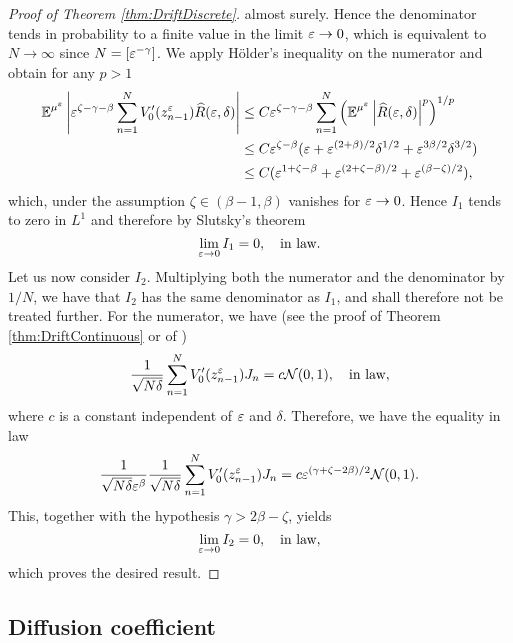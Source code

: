 \documentclass[10pt]{article}
\begin{document}
\begin{proof}[Proof of Theorem \ref{thm:DriftDiscrete}]
	almost surely. Hence the denominator tends in probability to a finite value in the limit $\varepsilon \to 0$, which is equivalent to $N \to \infty$ since $N = [\varepsilon^{-\gamma}]$. We apply Hölder's inequality on the numerator and obtain for any $p > 1$
	\begin{equation}
	\begin{aligned}
		\operatorname{\mathbb{E}}^{\mu^\varepsilon} \left\lvert\varepsilon^{\zeta-\gamma-\beta} \sum_{n=1}^{N}V_0'(z^\varepsilon_{n-1})\widehat R(\varepsilon, \delta)\right\rvert &\leq C \varepsilon^{\zeta-\gamma-\beta}\sum_{n=1}^{N} \left(\operatorname{\mathbb{E}}^{\mu^\varepsilon} \left\lvert\widehat R(\varepsilon, \delta)\right\rvert^p\right)^{1/p}\\
		&\leq C \varepsilon^{\zeta-\beta}(\varepsilon +  \varepsilon^{(2+\beta)/2}\delta^{1/2} + \varepsilon^{3\beta/2}\delta^{3/2})\\
		&\leq C (\varepsilon^{1+\zeta-\beta} +  \varepsilon^{(2+\zeta-\beta)/2} + \varepsilon^{(\beta-\zeta)/2}),
	\end{aligned}
	\end{equation}
	which, under the assumption $\zeta \in (\beta-1, \beta)$ vanishes for $\varepsilon \to 0$. Hence $I_1$ tends to zero in $L^1$ and therefore by Slutsky's theorem
	\begin{equation}
		\lim_{\varepsilon \to 0} I_1 = 0, \quad \text{in law}.
	\end{equation}
	Let us now consider $I_2$. Multiplying both the numerator and the denominator by $1/N$, we have that $I_2$ has the same denominator as $I_1$, and shall therefore not be treated further. For the numerator, we have (see the proof of Theorem \ref{thm:DriftContinuous} or of \cite[Theorem 3.5]{PaS07})
	\begin{equation}
		\frac{1}{\sqrt{N\delta}}\sum_{n=1}^{N}V_0'(z^\varepsilon_{n-1})J_n = c\mathcal N(0, 1), \quad \text{in law},
	\end{equation}
	where $c$ is a constant independent of $\varepsilon$ and $\delta$. Therefore, we have the equality in law
	\begin{equation}
		\frac{1}{\sqrt{N\delta} \varepsilon^\beta} \frac{1}{\sqrt{N\delta}}\sum_{n=1}^{N}V_0'(z^\varepsilon_{n-1})J_n = c\varepsilon^{(\gamma +\zeta - 2\beta)/2} \mathcal N(0, 1).
	\end{equation} 
	This, together with the hypothesis $\gamma > 2\beta - \zeta$, yields
	\begin{equation}
		\lim_{\varepsilon \to 0} I_2 = 0, \quad \text{in law},
	\end{equation}
	which proves the desired result.
\end{proof}

\subsection{Diffusion coefficient}
\end{document}
